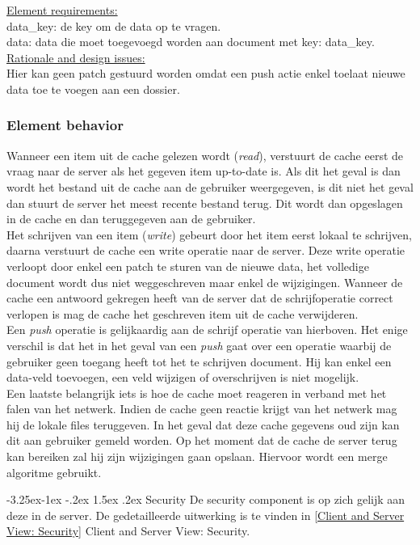 \documentclass[a4paper,10pt]{book}
\makeatletter
\renewcommand\paragraph{\@startsection{paragraph}{4}{\z@}%
  {-3.25ex\@plus -1ex \@minus -.2ex}%
  {1.5ex \@plus .2ex}%
  {\normalfont\normalsize\bfseries}}
\makeatother
\begin{document}
\underline{Element requirements:}\\
data\_key: de key om de data op te vragen.\\
data: data die moet toegevoegd worden aan document met key: data\_key.\\

\underline{Rationale and design issues:}\\
Hier kan geen patch gestuurd worden omdat een push actie enkel toelaat nieuwe data toe te voegen aan een dossier.

\subsubsection{Element behavior}
Wanneer een item uit de cache gelezen wordt (\textit{read}), verstuurt de cache eerst de vraag naar de server als het gegeven item up-to-date is.  Als dit het geval is dan wordt het bestand uit de cache aan de gebruiker weergegeven, is dit niet het geval dan stuurt de server het meest recente bestand terug.  Dit wordt dan opgeslagen in de cache en dan teruggegeven aan de gebruiker.\\
Het schrijven van een item (\textit{write}) gebeurt door het item eerst lokaal te schrijven, daarna verstuurt de cache een write operatie naar de server.  Deze write operatie verloopt door enkel een patch te sturen van de nieuwe data, het volledige document wordt dus niet weggeschreven maar enkel de wijzigingen.  Wanneer de cache een antwoord gekregen heeft van de server dat de schrijfoperatie correct verlopen is mag de cache het geschreven item uit de cache verwijderen.\\
Een \textit{push} operatie is gelijkaardig aan de schrijf operatie van hierboven.  Het enige verschil is dat het in het geval van een \textit{push} gaat over een operatie waarbij de gebruiker geen toegang heeft tot het te schrijven document.  Hij kan enkel een data-veld toevoegen, een veld wijzigen of overschrijven is niet mogelijk.\\
Een laatste belangrijk iets is hoe de cache moet reageren in verband met het falen van het netwerk.  Indien de cache geen reactie krijgt van het netwerk mag hij de lokale files teruggeven.  In het geval dat deze cache gegevens oud zijn kan dit aan gebruiker gemeld worden.  Op het moment dat de cache de server terug kan bereiken zal hij zijn wijzigingen gaan opslaan.  Hiervoor wordt een merge algoritme gebruikt.

\paragraph{Security}
De security component is op zich gelijk aan deze in de server.  De gedetailleerde uitwerking is te vinden in \ref{Client and Server View: Security} Client and Server View: Security.
\end{document}
